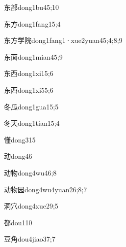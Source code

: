 \begin{verbete}{东部}{dong1bu4}{5;10}
\end{verbete}
\begin{verbete}{东方}{dong1fang1}{5;4}
\end{verbete}
\begin{verbete}{东方学院}{dong1fang1·xue2yuan4}{5;4;8;9}
\end{verbete}
\begin{verbete}{东面}{dong1mian4}{5;9}
\end{verbete}
\begin{verbete}{东西}{dong1xi1}{5;6}
\end{verbete}
\begin{verbete}{东西}{dong1xi5}{5;6}
\end{verbete}
\begin{verbete}{冬瓜}{dong1gua1}{5;5}
\end{verbete}
\begin{verbete}{冬天}{dong1tian1}{5;4}
\end{verbete}
\begin{verbete}{懂}{dong3}{15}
\end{verbete}
\begin{verbete}{动}{dong4}{6}
\end{verbete}
\begin{verbete}{动物}{dong4wu4}{6;8}
\end{verbete}
\begin{verbete}{动物园}{dong4wu4yuan2}{6;8;7}
\end{verbete}
\begin{verbete}{洞穴}{dong4xue2}{9;5}
\end{verbete}
\begin{verbete}{都}{dou1}{10}
\end{verbete}
\begin{verbete}{豆角}{dou4jiao3}{7;7}
\end{verbete}

